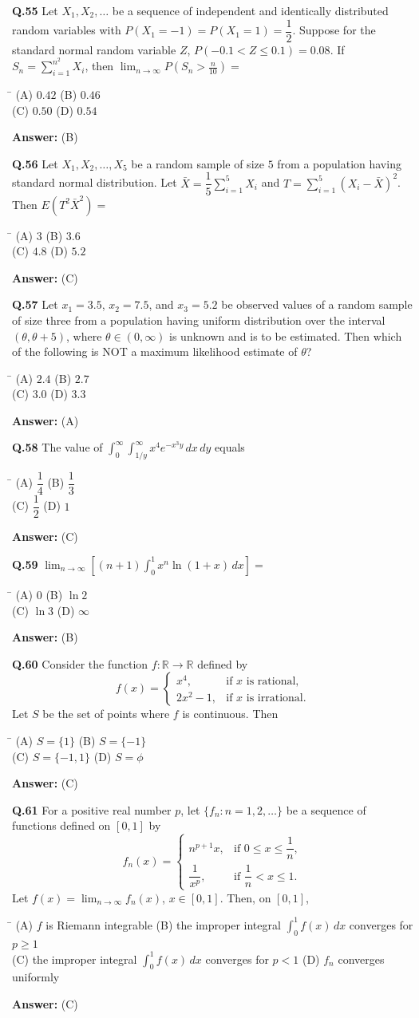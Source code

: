 \documentclass[11pt,a4paper]{article}
\newcommand{\optsfourA}[4]{%
  \begin{tabbing}
    \hspace{0.48\linewidth}\=\kill
    (A) #1 \> (B) #2 \\[2pt]
    (C) #3 \> (D) #4
  \end{tabbing}%
}
\newcommand{\ans}[1]{\textbf{Answer:} #1\par\medskip}
\begin{document}
\textbf{Q.55} Let $X_1, X_2, \dots$ be a sequence of independent and identically distributed random variables with $P(X_1 = -1) = P(X_1 = 1) = \dfrac{1}{2}$. Suppose for the standard normal random variable $Z$, $P(-0.1 < Z \le 0.1) = 0.08$. If $S_n = \displaystyle\sum_{i=1}^{n^2} X_i$, then $\displaystyle\lim_{n\to\infty} P\!\left(S_n > \frac{n}{10}\right) =$
\optsfourA{$0.42$}{$0.46$}{$0.50$}{$0.54$}
\ans{(B)}

\textbf{Q.56} Let $X_1, X_2, \dots, X_5$ be a random sample of size $5$ from a population having standard normal distribution. Let $\bar{X} = \dfrac{1}{5}\displaystyle\sum_{i=1}^{5} X_i$ and $T = \displaystyle\sum_{i=1}^{5} (X_i - \bar{X})^2$. Then $E(T^2 \bar{X}^2) =$
\optsfourA{$3$}{$3.6$}{$4.8$}{$5.2$}
\ans{(C)}

\textbf{Q.57} Let $x_1 = 3.5$, $x_2 = 7.5$, and $x_3 = 5.2$ be observed values of a random sample of size three from a population having uniform distribution over the interval $(\theta, \theta + 5)$, where $\theta \in (0, \infty)$ is unknown and is to be estimated. Then which of the following is NOT a maximum likelihood estimate of $\theta$?
\optsfourA{$2.4$}{$2.7$}{$3.0$}{$3.3$}
\ans{(A)}

\textbf{Q.58} The value of $\displaystyle\int_0^\infty \int_{1/y}^\infty x^4 e^{-x^3 y}\,dx\,dy$ equals
\optsfourA{$\dfrac{1}{4}$}{$\dfrac{1}{3}$}{$\dfrac{1}{2}$}{$1$}
\ans{(C)}

\textbf{Q.59} $\displaystyle\lim_{n\to\infty} \left[(n + 1)\int_0^1 x^n \ln(1 + x)\,dx\right] =$
\optsfourA{$0$}{$\ln 2$}{$\ln 3$}{$\infty$}
\ans{(B)}

\textbf{Q.60} Consider the function $f : \mathbb{R} \to \mathbb{R}$ defined by
\[
  f(x) = \begin{cases} x^4, & \text{if } x \text{ is rational}, \\ 2x^2 - 1, & \text{if } x \text{ is irrational}. \end{cases}
\]
Let $S$ be the set of points where $f$ is continuous. Then
\optsfourA{$S = \{1\}$}{$S = \{-1\}$}{$S = \{-1, 1\}$}{$S = \phi$}
\ans{(C)}

\textbf{Q.61} For a positive real number $p$, let $\{f_n : n = 1, 2, \dots\}$ be a sequence of functions defined on $[0, 1]$ by
\[
  f_n(x) = \begin{cases} n^{p+1} x, & \text{if } 0 \le x \le \dfrac{1}{n}, \\ \dfrac{1}{x^p}, & \text{if } \dfrac{1}{n} < x \le 1. \end{cases}
\]
Let $f(x) = \displaystyle\lim_{n\to\infty} f_n(x)$, $x \in [0, 1]$. Then, on $[0, 1]$,
\optsfourA{$f$ is Riemann integrable}{the improper integral $\displaystyle\int_0^1 f(x)\,dx$ converges for $p \ge 1$}{the improper integral $\displaystyle\int_0^1 f(x)\,dx$ converges for $p < 1$}{$f_n$ converges uniformly}
\ans{(C)}
\end{document}
